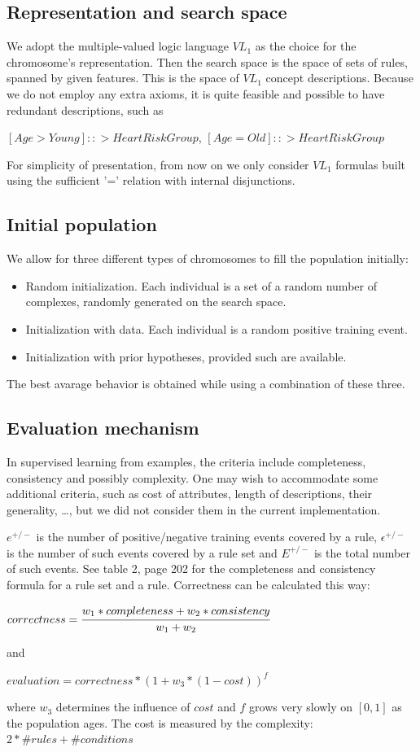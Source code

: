 \documentclass[12pt]{book}
\begin{document}
\subsection{Representation and search space}
We adopt the multiple-valued logic language $VL_1$ as the choice for the chromosome's representation. Then the search space is the space of sets of rules, spanned by given features. This is the space of $VL_1$ concept descriptions. Because we do not employ any extra axioms, it is quite feasible and possible to have redundant descriptions, such as
\begin{center}
$[Age > Young] ::> HeartRiskGroup$, $[Age = Old] ::> HeartRiskGroup$
\end{center}
For simplicity of presentation, from now on we only consider $VL_1$ formulas built using the sufficient '=' relation with internal disjunctions.

\subsection{Initial population}
We allow for three different types of chromosomes to fill the population initially:
\begin{itemize}
\item Random initialization. Each individual is a set of a random number of complexes, randomly generated on the search space.
\item Initialization with data. Each individual is a random positive training event.
\item Initialization with prior hypotheses, provided such are available.
\end{itemize}
The best avarage behavior is obtained while using a combination of these three.

\subsection{Evaluation mechanism}
\label{sec:evaluation}
In supervised learning from examples, the criteria include completeness, consistency and possibly complexity. One may wish to accommodate some additional criteria, such as cost of attributes, length of descriptions, their generality, \dots, but we did not consider them in the current implementation.

$e^{+/-}$ is the number of positive/negative training events covered by a rule, $\epsilon^{+/-}$ is the number of such events covered by a rule set and $E^{+/-}$ is the total number of such events. See table 2, page 202 for the completeness and consistency formula for a rule set and a rule. Correctness can be calculated this way:
\begin{center}
$correctness = \cfrac{w_1*completeness + w_2*consistency}{w_1 + w_2}$
\end{center}
and
\begin{center}
$evaluation = correctness*(1 + w_3*(1 - cost))^f$
\end{center}
where $w_3$ determines the influence of $cost$ and $f$ grows very slowly on $[0,1]$ as the population ages. The cost is measured by the complexity: $2*\#rules+\#conditions$
\end{document}

